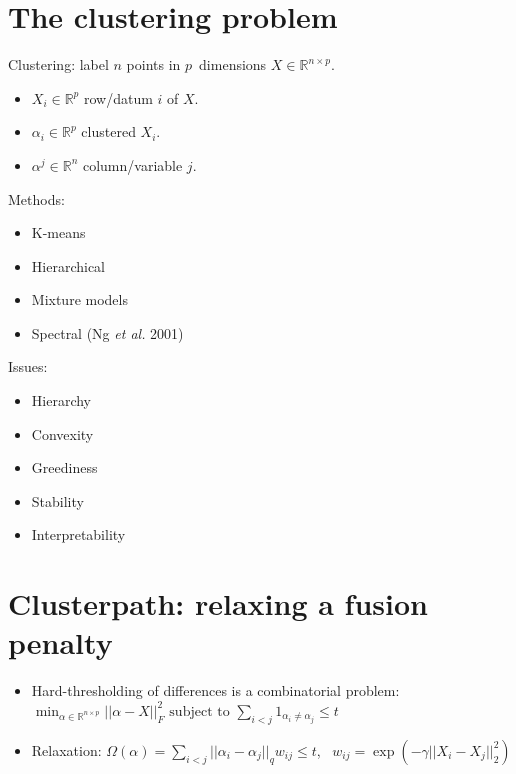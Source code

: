 \documentclass[]{posterDIGITEO}
\newcommand{\RR}{\mathbb R}
\begin{document}
\begin{multicols}{2}

\section{The clustering problem}
\begin{minipage}{0.45\columnwidth}
\raggedright
  Clustering: label $n$ points in $p$~dimensions
    $X\in\RR^{n\times p}$.
\begin{itemize}
\item  $X_i\in\RR^p$ row/datum $i$ of $X$.
\item $\alpha_i\in\RR^p$ clustered $X_i$.
\item $\alpha^j\in\RR^n$ column/variable $j$.
\end{itemize}
\end{minipage}
\begin{small}
\begin{minipage}{0.3\columnwidth}
  Methods:
    \begin{itemize}
  \item K-means
  \item Hierarchical
  \item Mixture models
  \item Spectral (Ng \emph{et al.} 2001)
    \end{itemize}
\end{minipage}
\begin{minipage}{0.25\columnwidth}
    Issues:
    \begin{itemize}
    \item Hierarchy
    \item Convexity
    \item Greediness
    \item Stability
    \item Interpretability 
  \end{itemize}
\end{minipage}
\end{small}

\section{Clusterpath: relaxing a fusion penalty}
\begin{itemize}
\item Hard-thresholding of differences is a combinatorial problem:
$
 \min_{    \alpha\in\RR^{n\times p}}       ||\alpha-X||_F^2 \text{  subject to  }
\sum_{i<j}1_{\alpha_i\neq\alpha_j} \leq t$
\item Relaxation: $\Omega(\alpha)=\sum_{i<j}||\alpha_i-\alpha_j||_q
  w_{ij}\leq t$, \ {\small $w_{ij} = \exp(-\gamma||X_i-X_j||^2_2)$}
  

\end{itemize}
\end{multicols}
\end{document}

